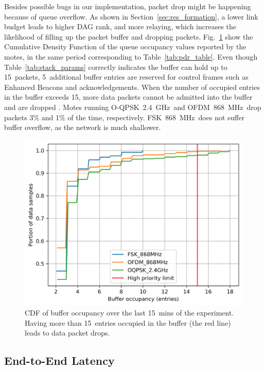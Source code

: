 \documentclass[sensors,article,submit,moreauthors,pdftex]{Definitions/mdpi}
\newcommand{\fsk}           {FSK~868~MHz}
\newcommand{\oqpsk}         {O-QPSK~2.4~GHz}
\newcommand{\ofdm}          {OFDM~868~MHz}
\newcommand{\figwidth}      {0.78}
\begin{document}

Besides possible bugs in our implementation, packet drop might be happening because of queue overflow.
As shown in Section~\ref{sec:res_formation}, a lower link budget leads to higher DAG rank, and more relaying, which increases the likelihood of filling up the packet buffer and dropping packets.
Fig.~\ref{fig:maxBufferSize_cdf_plot_full_steady_15} show the Cumulative Density Function of the queue occupancy values reported by the motes, in the same period corresponding to Table~\ref{tab:pdr_table}.
Even though Table~\ref{tab:stack_params} correctly indicates the buffer can hold up to 15~packets, 5~additional buffer entries are reserved for control frames such as Enhanced Beacons and acknowledgements.
When the number of occupied entries in the buffer exceeds 15, more data packets cannot be admitted into the buffer and are dropped .
Motes running \oqpsk\ and \ofdm\ drop packets 3\% and 1\% of the time, respectively.
\fsk\ does not suffer buffer overflow, as the network is much shallower.

\begin{figure}
	\centering
	\includegraphics[width=\figwidth\columnwidth]{maxBufferSize_cdf_plot_full_steady_15}
	\caption{CDF of buffer occupancy over the last 15~mins of the experiment. Having more than 15~entries occupied in the buffer (the red line) leads to data packet drops.}
    \label{fig:maxBufferSize_cdf_plot_full_steady_15}
\end{figure}

\subsection{End-to-End Latency}
\label{sec:res_latency}
\end{document}
